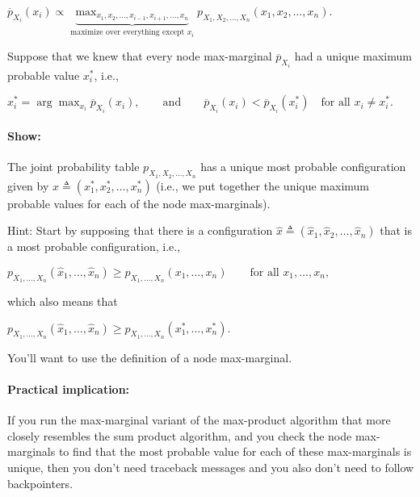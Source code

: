\documentclass[6008notes.tex]{subfiles}
\begin{document}
{\centering$\overline{p}_{X_{i}}(x_{i})\propto \underbrace{\max _{x_{1},x_{2},\dots ,x_{i-1},x_{i+1},\dots ,x_{n}}}_{\text {maximize over everything except }x_{i}}p_{X_{1},X_{2},\dots ,X_{n}}(x_{1},x_{2},\dots ,x_{n}).$ \par}
 
Suppose that we knew that every node max-marginal $\overline{p}_{X_ i}$ had a unique maximum probable value $x_ i^*$, i.e.,

{\centering$x_ i^* = \arg \max _{x_ i} \overline{p}_{X_ i}(x_ i), \qquad \text {and} \qquad \overline{p}_{X_ i}(x_ i) < \overline{p}_{X_ i}(x_ i^*) \quad \text {for all }x_ i \ne x_ i^*.$ \par}
 
\paragraph{Show:} The joint probability table $p_{X_1,X_2,\dots ,X_ n}$ has a unique most probable configuration given by $x\triangleq (x_1^*,x_2^*,\dots ,x_ n^*)$ (i.e., we put together the unique maximum probable values for each of the node max-marginals).

Hint: Start by supposing that there is a configuration $\widehat{x}\triangleq (\widehat{x}_1, \widehat{x}_2, \dots , \widehat{x}_ n)$ that is a most probable configuration, i.e.,

{\centering$p_{X_1,\dots ,X_ n}(\widehat{x}_1, \dots , \widehat{x}_ n) \ge p_{X_1,\dots ,X_ n}(x_1, \dots , x_ n)\qquad \text {for all }x_1,\dots ,x_ n,$ \par}
 
which also means that

{\centering$p_{X_1,\dots ,X_ n}(\widehat{x}_1, \dots , \widehat{x}_ n) \ge p_{X_1,\dots ,X_ n}(x_1^*, \dots , x_ n^*).$ \par}
 
You'll want to use the definition of a node max-marginal.

\paragraph{Practical implication:} If you run the max-marginal variant of the max-product algorithm that more closely resembles the sum product algorithm, and you check the node max-marginals to find that the most probable value for each of these max-marginals is unique, then you don't need traceback messages and you also don't need to follow backpointers.
\end{document}
